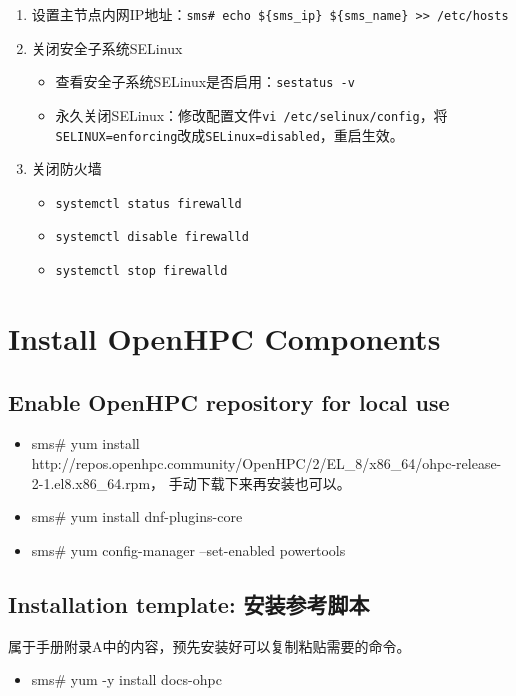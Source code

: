 {\begin{enumerate}
\item 设置主节点内网IP地址：\verb|sms# echo ${sms_ip} ${sms_name} >> /etc/hosts|


\item 关闭安全子系统SELinux
\begin{itemize}
\item 查看安全子系统SELinux是否启用：\verb|sestatus -v|

\item 永久关闭SELinux：修改配置文件\verb|vi /etc/selinux/config|，将\verb|SELINUX=enforcing|改成\verb|SELinux=disabled|，重启生效。
\end{itemize}

\item 关闭防火墙
\begin{itemize}
\item \verb|systemctl status firewalld|
\item \verb|systemctl disable firewalld|
\item \verb|systemctl stop firewalld|
\end{itemize}
\end{enumerate}


\section{Install OpenHPC Components}
\subsection{Enable OpenHPC repository for local use}
\begin{itemize}
\item  sms\# yum install http://repos.openhpc.community/OpenHPC/2/EL\_8/x86\_64/ohpc-release-2-1.el8.x86\_64.rpm，
 手动下载下来再安装也可以。
 \item sms\# yum install dnf-plugins-core
 \item sms\# yum config-manager --set-enabled powertools
\end{itemize}


\subsection{Installation template: 安装参考脚本}
属于手册附录A中的内容，预先安装好可以复制粘贴需要的命令。

\begin{itemize}
\item sms\# yum -y install docs-ohpc


\end{itemize}}
